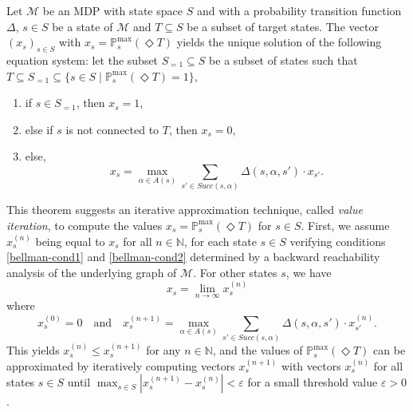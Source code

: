 \begin{theorem} \label{bellman1}
  Let $\mathcal{M}$ be an MDP with state space $S$ and with a probability transition function $\Delta$, $s \in S$ be a state of $\mathcal{M}$ and $T \subseteq S$ be a subset of target states. The vector $(x_s)_{s \in S}$ with $x_s = \mathbb{P}_s^{\max}(\Diamond T)$ yields the unique solution of the following equation system: let the subset $S_{=1} \subseteq S$ be a subset of states such that $T \subseteq S_{=1} \subseteq \{s \in S \; | \; \mathbb{P}^{\max}_s(\Diamond T) = 1 \}$,
  \begin{enumerate}[(1.)]
    \item if $s \in S_{=1}$, then $x_s=1$,
    \label{bellman-cond1}
    \item else if $s$ is not connected to $T$, then $x_s=0$,
    \label{bellman-cond2}
    \item else,
    \[ x_s = \max_{\alpha \in A(s)} \sum_{s' \in Succ(s, \alpha)} \Delta(s, \alpha, s') \cdot x_{s'}. \]
    \label{bellman-cond3}
  \end{enumerate}
\end{theorem}
This theorem suggests an iterative approximation technique, called \textit{value iteration}, to compute the values $x_s=\mathbb{P}^{\max}_s(\Diamond T)$ for $s \in S$.
First, we assume $x_s^{(n)}$ being equal to $x_s$ for all $n \in \mathbb{N}$, for each state $s \in S$ verifying conditions \ref{bellman-cond1} and \ref{bellman-cond2} determined by a backward reachability analysis of the underlying graph of $\mathcal{M}$. For other states $s$, we have
\[x_s = \lim_{n \rightarrow \infty} x_s^{(n)}\]
where
\[x_s^{(0)} = 0 \quad \text{and} \quad x_s^{(n+1)} = \max_{\alpha \in A(s)} \sum_{s' \in Succ(s, \alpha)} \Delta(s, \alpha, s') \cdot x_{s'}^{(n)}. \]
This yields $x_s^{(n)} \leq x_s^{(n+1)}$ for any $n \in \mathbb{N}$, and the values of $\mathbb{P}^{\max}_s(\Diamond T)$ can be approximated by iteratively computing vectors $x_s^{(n+1)}$
with vectors $x_s^{(n)}$ for all states $s \in S$ until $\max_{s \in S} |x_s^{(n+1)} - x_s^{(n)}| < \varepsilon$ for a small threshold value $\varepsilon > 0$.
